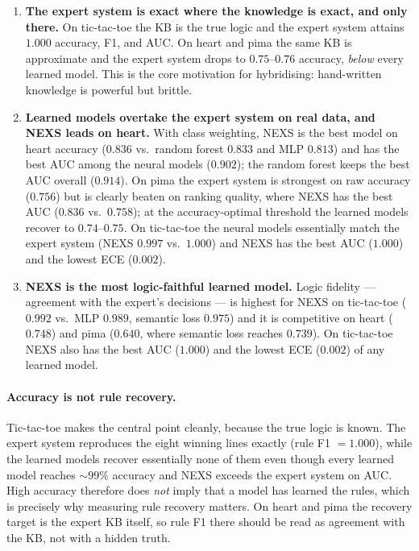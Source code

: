 \documentclass[11pt]{article}
\newcommand{\nexs}{\textsc{NEXS}}
\begin{document}
\begin{enumerate}
  \item \textbf{The expert system is exact where the knowledge is exact, and only
  there.} On tic-tac-toe the KB is the true logic and the expert system attains
  $1.000$ accuracy, F1, and AUC. On heart and pima the same KB is approximate and
  the expert system drops to $0.75$--$0.76$ accuracy, \emph{below} every learned
  model. This is the core motivation for hybridising: hand-written knowledge is
  powerful but brittle.
  \item \textbf{Learned models overtake the expert system on real data, and
  \nexs{} leads on heart.} With class weighting, \nexs{} is the best model on
  heart accuracy ($0.836$ vs.\ random forest $0.833$ and MLP $0.813$) and has the
  best AUC among the neural models ($0.902$); the random forest keeps the best AUC
  overall ($0.914$). On pima the expert system is strongest on raw accuracy
  ($0.756$) but is clearly beaten on ranking quality, where \nexs{} has the best
  AUC ($0.836$ vs.\ $0.758$); at the accuracy-optimal threshold the learned models
  recover to $0.74$--$0.75$. On tic-tac-toe the neural models essentially match
  the expert system (\nexs{} $0.997$ vs.\ $1.000$) and \nexs{} has the best AUC
  ($1.000$) and the lowest ECE ($0.002$).
  \item \textbf{\nexs{} is the most logic-faithful learned model.} Logic fidelity
  --- agreement with the expert's decisions --- is highest for \nexs{} on
  tic-tac-toe ($0.992$ vs.\ MLP $0.989$, semantic loss $0.975$) and it is
  competitive on heart ($0.748$) and pima ($0.640$, where semantic loss reaches
  $0.739$). On tic-tac-toe \nexs{} also has the best AUC ($1.000$) and the lowest
  ECE ($0.002$) of any learned model.
\end{enumerate}

\paragraph{Accuracy is not rule recovery.}
Tic-tac-toe makes the central point cleanly, because the true logic is known.
The expert system reproduces the eight winning lines exactly (rule F1 $=1.000$),
while the learned models recover essentially none of them even though every
learned model reaches ${\sim}99\%$ accuracy and \nexs{} exceeds the expert system
on AUC. High accuracy therefore does \emph{not} imply that a model has learned
the rules, which is precisely why measuring rule recovery matters. On heart and
pima the recovery target is the expert KB itself, so rule F1 there should be read
as agreement with the KB, not with a hidden truth.
\end{document}
